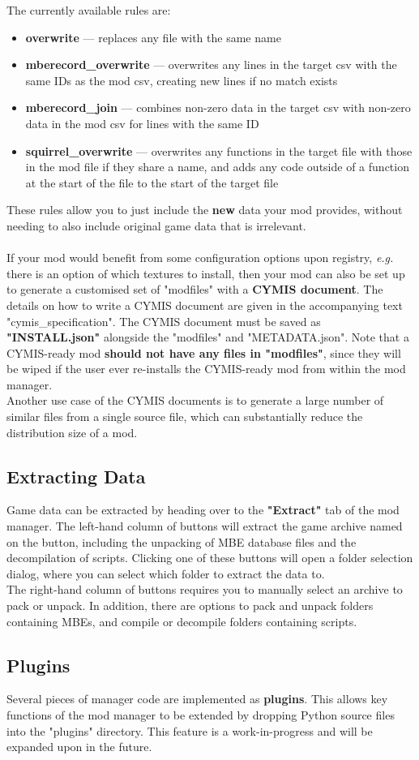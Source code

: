 \documentclass{article}
\begin{document}
The currently available rules are:
\begin{itemize}
\item \textbf{overwrite} --- replaces any file with the same name
\item \textbf{mberecord\_overwrite} --- overwrites any lines in the target csv with the same IDs as the mod csv, creating new lines if no match exists
\item \textbf{mberecord\_join} --- combines non-zero data in the target csv with non-zero data in the mod csv for lines with the same ID
\item \textbf{squirrel\_overwrite} --- overwrites any functions in the target file with those in the mod file if they share a name, and adds any code outside of a function at the start of the file to the start of the target file
\end{itemize}
These rules allow you to just include the \textbf{new} data your mod provides, without needing to also include original game data that is irrelevant.\\\\
If your mod would benefit from some configuration options upon registry, \textit{e.g.} there is an option of which textures to install, then your mod can also be set up to generate a customised set of "modfiles" with a \textbf{CYMIS document}. The details on how to write a CYMIS document are given in the accompanying text "cymis\_specification". The CYMIS document must be saved as \textbf{"INSTALL.json"} alongside the "modfiles" and "METADATA.json". Note that a CYMIS-ready mod \textbf{should not have any files in "modfiles"}, since they will be wiped if the user ever re-installs the CYMIS-ready mod from within the mod manager.\\
Another use case of the CYMIS documents is to generate a large number of similar files from a single source file, which can substantially reduce the distribution size of a mod.

\subsection{Extracting Data}
Game data can be extracted by heading over to the \textbf{"Extract"} tab of the mod manager. The left-hand column of buttons will extract the game archive named on the button, including the unpacking of MBE database files and the decompilation of scripts. Clicking one of these buttons will open a folder selection dialog, where you can select which folder to extract the data to.\\
The right-hand column of buttons requires you to manually select an archive to pack or unpack. In addition, there are options to pack and unpack folders containing MBEs, and compile or decompile folders containing scripts.

\subsection{Plugins}
Several pieces of manager code are implemented as \textbf{plugins}. This allows key functions of the mod manager to be extended by dropping Python source files into the "plugins" directory. This feature is a work-in-progress and will be expanded upon in the future.
\end{document}
